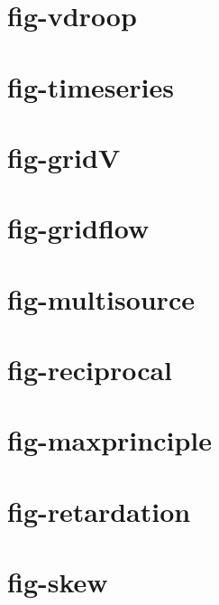 \documentclass[11pt]{article}
\begin{document}
\section*{fig-vdroop}\par\vspace{1cm}
\section*{fig-timeseries}\par\vspace{1cm}
\section*{fig-gridV}\par\vspace{1cm}
\section*{fig-gridflow}\par\vspace{1cm}
\section*{fig-multisource}\par\vspace{1cm}
\section*{fig-reciprocal}\par\vspace{1cm}
\section*{fig-maxprinciple}\par\vspace{1cm}
\section*{fig-retardation}\par\vspace{1cm}
\section*{fig-skew}\par\vspace{1cm}
\end{document}
